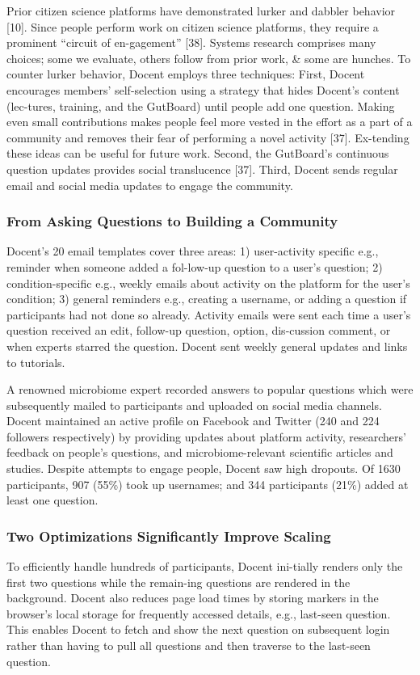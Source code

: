 Prior citizen science platforms have demonstrated lurker and dabbler behavior [10]. Since people perform work on citizen science platforms, they require a prominent “circuit of en-gagement” [38]. Systems research comprises many choices; some we evaluate, others follow from prior work, \& some are hunches. To counter lurker behavior, Docent employs three techniques: First, Docent encourages members’ self-selection using a strategy that hides Docent’s content (lec-tures, training, and the GutBoard) until people add one question. Making even small contributions makes people feel more vested in the effort as a part of a community and removes their fear of performing a novel activity [37]. Ex-tending these ideas can be useful for future work. Second, the GutBoard’s continuous question updates provides social translucence [37]. Third, Docent sends regular email and social media updates to engage the community.

\subsubsection{From Asking Questions to Building a Community}
Docent’s 20 email templates cover three areas: 1) user-activity specific e.g., reminder when someone added a fol-low-up question to a user’s question; 2) condition-specific e.g., weekly emails about activity on the platform for the user’s condition; 3) general reminders e.g., creating a username, or adding a question if participants had not done so already. Activity emails were sent each time a user’s question received an edit, follow-up question, option, dis-cussion comment, or when experts starred the question. Docent sent weekly general updates and links to tutorials.
 
A renowned microbiome expert recorded answers to popular questions which were subsequently mailed to participants and uploaded on social media channels. Docent maintained an active profile on Facebook and Twitter (240 and 224 followers respectively) by providing updates about platform activity, researchers’ feedback on people’s questions, and microbiome-relevant scientific articles and studies. Despite attempts to engage people, Docent saw high dropouts. Of 1630 participants, 907 (55\%) took up usernames; and 344 participants (21\%) added at least one question.

\subsubsection{Two Optimizations Significantly Improve Scaling}
To efficiently handle hundreds of participants, Docent ini-tially renders only the first two questions while the remain-ing questions are rendered in the background. Docent also reduces page load times by storing markers in the browser’s local storage for frequently accessed details, e.g., last-seen question. This enables Docent to fetch and show the next question on subsequent login rather than having to pull all questions and then traverse to the last-seen question. 

